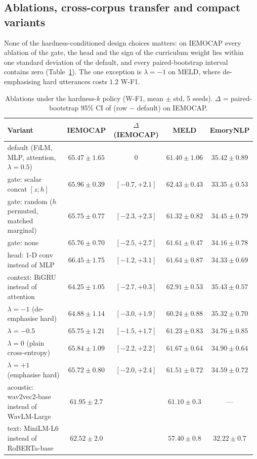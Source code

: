 \documentclass[journal]{IEEEtran}
\newcommand{\wf}{W-F1}
\begin{document}
\subsection{Ablations, cross-corpus transfer and compact variants}
None of the hardness-conditioned design choices matters: on IEMOCAP every ablation of the gate, the head and the sign of the curriculum weight lies within one standard deviation of the default, and every paired-bootstrap interval contains zero (Table~\ref{tab:ablation}). The one exception is $\lambda = -1$ on MELD, where de-emphasising hard utterances costs $1.2$ \wf.

\begin{table}[t]\centering\footnotesize\setlength{\tabcolsep}{3pt}
\caption{Ablations under the hardness-$k$ policy (\wf, mean $\pm$ std, 5 seeds). $\Delta$ = paired-bootstrap 95\% CI of (row $-$ default) on IEMOCAP.}\label{tab:ablation}
\begin{tabular}{lcccc}\toprule
Variant & IEMOCAP & $\Delta$ (IEMOCAP) & MELD & EmoryNLP \\ \midrule
default (FiLM, MLP, attention, $\lambda = 0.5$) & $65.47 \pm 1.65$ & 0 & $61.40 \pm 1.06$ & $35.42 \pm 0.89$ \\
gate: scalar concat $[z; h]$ & $65.96 \pm 0.39$ & $[-0.7, +2.1]$ & $62.43 \pm 0.43$ & $33.35 \pm 0.53$ \\
gate: random ($h$ permuted, matched marginal) & $65.75 \pm 0.77$ & $[-2.3, +2.3]$ & $61.32 \pm 0.82$ & $34.45 \pm 0.79$ \\
gate: none & $65.76 \pm 0.70$ & $[-2.5, +2.7]$ & $61.61 \pm 0.47$ & $34.16 \pm 0.78$ \\
head: 1-D conv instead of MLP & $66.45 \pm 1.75$ & $[-1.2, +3.1]$ & $61.64 \pm 0.87$ & $34.33 \pm 0.69$ \\
context: BiGRU instead of attention & $64.25 \pm 1.05$ & $[-2.7, +0.3]$ & $62.91 \pm 0.53$ & $35.43 \pm 0.57$ \\
$\lambda = -1$ (de-emphasise hard) & $64.88 \pm 1.14$ & $[-3.0, +1.9]$ & $60.24 \pm 0.88$ & $35.32 \pm 0.70$ \\
$\lambda = -0.5$ & $65.75 \pm 1.21$ & $[-1.5, +1.7]$ & $61.23 \pm 0.83$ & $34.76 \pm 0.85$ \\
$\lambda = 0$ (plain cross-entropy) & $65.84 \pm 1.09$ & $[-2.2, +2.2]$ & $61.67 \pm 0.64$ & $34.90 \pm 0.64$ \\
$\lambda = +1$ (emphasise hard) & $65.72 \pm 0.80$ & $[-2.0, +2.4]$ & $61.51 \pm 0.72$ & $34.59 \pm 0.72$ \\
acoustic: wav2vec2-base instead of WavLM-Large & $61.95 \pm 2.7$ & & $61.10 \pm 0.3$ & --- \\
text: MiniLM-L6 instead of RoBERTa-base & $62.52 \pm 2.0$ & & $57.40 \pm 0.8$ & $32.22 \pm 0.7$ \\ \bottomrule
\end{tabular}
\end{table}
\end{document}
